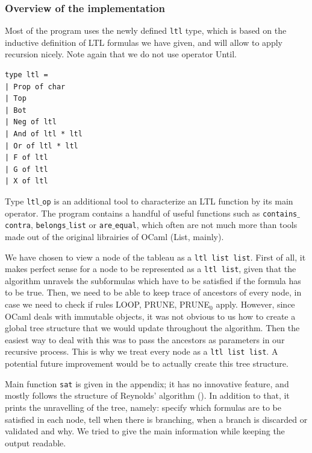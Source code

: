 \documentclass[11pt]{article}
\theoremstyle{definition}
\begin{document}
\subsubsection*{Overview of the implementation}

Most of the program uses the newly defined {\tt ltl} type, which is based on the inductive 
definition of LTL formulas we have given, and will allow to apply recursion nicely.
Note again that we do not use operator Until.
\begin{lstlisting}
type ltl =
| Prop of char
| Top
| Bot
| Neg of ltl
| And of ltl * ltl
| Or of ltl * ltl
| F of ltl
| G of ltl
| X of ltl
\end{lstlisting}

Type {\tt ltl$\_$op} is an additional tool to characterize an LTL function by its main operator.
The program contains a handful of useful functions such as {\tt contains$\_$contra}, {\tt belongs$\_$list}
or {\tt are$\_$equal}, which often are not much more than tools made out of the original librairies
of OCaml (List, mainly).

We have chosen to view a node of the tableau as a {\tt ltl list list}.
First of all, it makes perfect sense for a
node to be represented as a {\tt ltl list}, given that the algorithm unravels the subformulas which 
have to be satisfied if the formula has to be true. Then, we need to be able to keep trace
of ancestors of every node, in case we need to check if rules LOOP, PRUNE, PRUNE$_0$ apply.
However, since OCaml deals with immutable objects, it was not obvious to us how to create a global tree structure
that we would update throughout the algorithm. Then the easiest way to deal with this was
to pass the ancestors as parameters
in our recursive process. This is why we treat every node as a {\tt ltl list list}. A potential future improvement 
would be to actually create this tree structure.

Main function {\tt sat} is given in the appendix; it has no innovative feature, and mostly
follows 
the structure of Reynolds' algorithm (\cite{ReyLTL}). In addition to that, it prints 
the unravelling of the tree, namely: specify which formulas are to be satisfied 
in each node, tell when there is branching, when a branch is discarded or validated and why.
We tried to give the main information while keeping the output readable.
\end{document}

